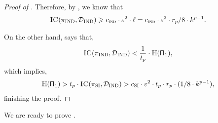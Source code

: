 \documentclass[11pt]{article}
\theoremstyle{definition}
\renewcommand{\geq}{\geqslant}
\newcommand{\tvd}[2]{\ensuremath{\norm{#1 - #2}_{\mathrm{tvd}}}}
\newcommand{\eps}{\ensuremath{\varepsilon}}
\newcommand{\norm}[1]{\ensuremath{\|#1\|}}
\newcommand{\rv}[1]{\ensuremath{{\mathsf{#1}}}\xspace}
\newcommand{\rY}{\rv{Y}}
\newcommand{\HH}{\ensuremath{\mathbb{H}}}
\newcommand{\en}[1]{\ensuremath{\HH(#1)}}
\newcommand{\ans}{\ensuremath{\textnormal{\textsc{ans}}}}
\newcommand{\istar}{\ensuremath{i^{\star}}}
\newcommand{\prot}{\ensuremath{\pi}}
\newcommand{\Prot}{\ensuremath{\Pi}}
\newcommand{\rProt}{\ensuremath{\rv{\Prot}}}
\newcommand{\ic}{\ensuremath{\textnormal{\textsc{IC}}}}
\newcommand{\rS}{\ensuremath{\rv{S}}}
\newcommand{\protsetint}{\ensuremath{\prot_{\textnormal{\textsc{SI}}}}}
\newcommand{\protindex}{\ensuremath{\prot_{\textnormal{\textsc{IND}}}}}
\begin{document}
\begin{proof}[Proof of ]
	Therefore, by , we know that 
		\[
		\ic(\protindex, \cDind) \geq \cind \cdot \eps^2 \cdot \ell = \cind \cdot \eps^2 \cdot r_p/8 \cdot k^{p-1}.
		\]
		
		On the other hand,  says that,
		\[
		\ic(\protindex, \cDind)  < \frac{1}{t_p} \cdot \en{\rProt_1},
		\]
		which implies,
		\[
		\en{\rProt_1} > t_p \cdot \ic(\protsetint, \cDind) > \cSI \cdot \eps^2 \cdot t_p \cdot r_p \cdot (1/8 \cdot k^{p-1}),
		\]
		finishing the proof.
	\end{proof}
	
	
	We are ready to prove . 
	
\end{document}
